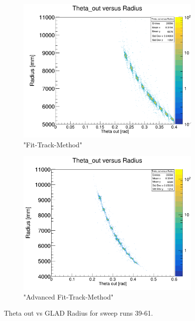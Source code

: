 \documentclass[12pt, letterpaper]{article}
\begin{document}
\begin{figure}[!htbp]
\begin{subfigure}{.5\textwidth}
\end{subfigure}
\begin{subfigure}{.5\textwidth}
  \centering
  \includegraphics[width=.9\linewidth]{plot_imgs/theta_out_rho_fit.png} 
  \caption{"Fit-Track-Method"}
  \label{fig:sub-second}
\end{subfigure}
\begin{subfigure}{.5\textwidth}
  \centering
  \includegraphics[width=.9\linewidth]{plot_imgs/theta_out_rho_last.png} 
  \caption{"Advanced Fit-Track-Method"}
  \label{fig:sub-second}
\end{subfigure}
\caption{Theta \textunderscore out vs GLAD Radius for sweep runs 39-61.}
\label{fig:fig}
\end{figure}
\FloatBarrier
\clearpage
\end{document}
